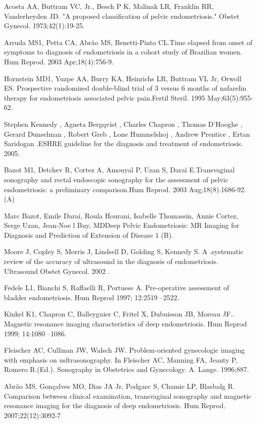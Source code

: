 \documentclass[12pt]{article} %
\begin{document}
Acosta AA, Buttram VC, Jr., Besch P K, Malinak LR, Franklin RR,
Vanderheyden JD. "A proposed classification of pelvic endometriosis."
Obstet Gynecol. 1973;42(1):19-25.


Arruda MS1, Petta CA, Abrão MS, Benetti-Pinto CL.Time elapsed from onset of symptoms to diagnosis of endometriosis in a cohort study of Brazilian women. Hum Reprod. 2003 Apr;18(4):756-9.

Hornstein MD1, Yuzpe AA, Burry KA, Heinrichs LR, Buttram VL Jr, Orwoll ES. Prospective randomized double-blind trial of 3 versus 6 months of nafarelin therapy for endometriosis associated pelvic pain.Fertil Steril. 1995 May;63(5):955-62.

Stephen Kennedy , Agneta Bergqvist  , Charles Chapron  , Thomas D’Hooghe  , Gerard Dunselman  , Robert Greb  , Lone Hummelshoj  , Andrew Prentice  , Ertan Saridogan .ESHRE guideline for the diagnosis and treatment of endometriosis. 2005.

Bazot M1, Detchev R, Cortez A, Amouyal P, Uzan S, Daraï E.Transvaginal sonography and rectal endoscopic sonography for the assessment of pelvic endometriosis: a preliminary comparison.Hum Reprod. 2003 Aug;18(8):1686-92. (A)

Marc Bazot, Emile Darai, Roula Hourani, Isabelle Thomassin, Annie Cortez, Serge Uzan, 
Jean-Noe l Buy, MDDeep Pelvic Endometriosis: MR Imaging for Diagnosis and Prediction of Extension of Disease 1 (B).


Moore J, Copley S, Morris J, Lindsell D, Golding S, Kennedy S. A .systematic review of the accuracy of ultrasound in the diagnosis of endometriosis. Ultrasound Obstet Gynecol. 2002 .

Fedele L1, Bianchi S, Raffaelli R, Portuese A. Pre-operative assessment of bladder endometriosis. Hum Reprod 1997; 12:2519 –2522.

Kinkel K1, Chapron C, Balleyguier C, Fritel X, Dubuisson JB, Moreau JF.. Magnetic resonance imaging characteristics of deep endometriosis. Hum Reprod 1999; 14:1080 –1086.

Fleischer AC, Cullinan JW, Walsch JW. Problem-oriented gynecologic imaging with emphasis on usltrasonography. In Fleischer AC, Manning FA, Jeanty P, Romero R.(Ed.). Sonography in Obstetrics and Gynecology. A.
Lange. 1996;887.

Abrão MS, Gonçalves MO, Dias JA Jr, Podgaec S, Chamie LP, Blasbalg R. Comparison between clinical examination, transvaginal sonography and magnetic resonance imaging for the diagnosis of
deep endometriosis. Hum Reprod. 2007;22(12):3092-7
\end{document}

